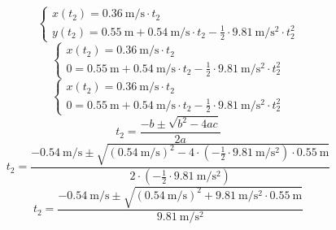 \documentclass{article}
\begin{document}
\begin{enumerate}[label=\alph*)]
          \begin{equation*}
              \begin{cases}
                  x(t_2) = \SI{0.36}{\meter\per\second} \cdot t_2 \\
                  y(t_2) = \SI{0.55}{\meter} + \SI{0.54}{\meter\per\second} \cdot t_2 - \frac{1}{2} \cdot \SI{9.81}{\meter\per\second\squared} \cdot t_{2}^2
              \end{cases}
          \end{equation*}
          \begin{equation*}
              \begin{cases}
                  x(t_2) = \SI{0.36}{\meter\per\second} \cdot t_2 \\
                  0 = \SI{0.55}{\meter} + \SI{0.54}{\meter\per\second} \cdot t_2 - \frac{1}{2} \cdot \SI{9.81}{\meter\per\second\squared} \cdot t_{2}^2
              \end{cases}
          \end{equation*}
          \begin{equation*}
              \begin{cases}
                  x(t_2) = \SI{0.36}{\meter\per\second} \cdot t_2 \\
                  0 = \SI{0.55}{\meter} + \SI{0.54}{\meter\per\second} \cdot t_2 - \frac{1}{2} \cdot \SI{9.81}{\meter\per\second\squared} \cdot t_{2}^2
              \end{cases}
          \end{equation*}
          \begin{equation*}
              t_2 = \frac{-b \pm \sqrt{b^2 - 4ac}}{2a}
          \end{equation*}
          \begin{equation*}
              t_2 = \frac{-\SI{0.54}{\meter\per\second} \pm \sqrt{(\SI{0.54}{\meter\per\second})^2 - 4 \cdot \left( -\frac{1}{2} \cdot \SI{9.81}{\meter\per\second\squared} \right) \cdot \SI{0.55}{\meter}}}{2 \cdot \left( -\frac{1}{2} \cdot \SI{9.81}{\meter\per\second\squared} \right)}
          \end{equation*}
          \begin{equation*}
              t_2 = \frac{-\SI{0.54}{\meter\per\second} \pm \sqrt{(\SI{0.54}{\meter\per\second})^2 + \SI{9.81}{\meter\per\second\squared} \cdot \SI{0.55}{\meter}}}{\SI{9.81}{\meter\per\second\squared}}
          \end{equation*}
          \begin{equation*}

\end{equation*}
\end{enumerate}
\end{document}

